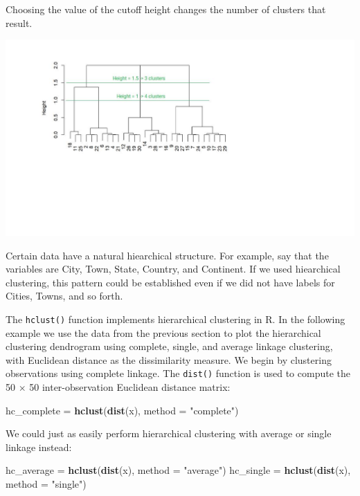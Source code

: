 \documentclass[openany]{book}
\newenvironment{Shaded}{\begin{snugshade}}{\end{snugshade}}
\newcommand{\DataTypeTok}[1]{\textcolor[rgb]{0.13,0.29,0.53}{#1}}
\newcommand{\KeywordTok}[1]{\textcolor[rgb]{0.13,0.29,0.53}{\textbf{#1}}}
\newcommand{\NormalTok}[1]{#1}
\newcommand{\StringTok}[1]{\textcolor[rgb]{0.31,0.60,0.02}{#1}}
\begin{document}
Choosing the value of the cutoff height changes the number of clusters that result.

\begin{center}\includegraphics[width=10\linewidth]{images/HClustering} \end{center}

Certain data have a natural hiearchical structure. For example, say that the variables are City, Town, State, Country, and Continent. If we used hiearchical clustering, this pattern could be established even if we did not have labels for Cities, Towns, and so forth.

The \texttt{hclust()} function implements hierarchical clustering in R. In the following example we use the data from the previous section to plot the hierarchical
clustering dendrogram using complete, single, and average linkage clustering,
with Euclidean distance as the dissimilarity measure. We begin by
clustering observations using complete linkage. The \texttt{dist()} function is used
to compute the 50 \(\times\) 50 inter-observation Euclidean distance matrix:

\begin{Shaded}
\begin{Highlighting}[]
\NormalTok{hc_complete =}\StringTok{ }\KeywordTok{hclust}\NormalTok{(}\KeywordTok{dist}\NormalTok{(x), }\DataTypeTok{method =} \StringTok{"complete"}\NormalTok{)}
\end{Highlighting}
\end{Shaded}

We could just as easily perform hierarchical clustering with average or
single linkage instead:

\begin{Shaded}
\begin{Highlighting}[]
\NormalTok{hc_average =}\StringTok{ }\KeywordTok{hclust}\NormalTok{(}\KeywordTok{dist}\NormalTok{(x), }\DataTypeTok{method =} \StringTok{"average"}\NormalTok{)}
\NormalTok{hc_single =}\StringTok{ }\KeywordTok{hclust}\NormalTok{(}\KeywordTok{dist}\NormalTok{(x), }\DataTypeTok{method =} \StringTok{"single"}\NormalTok{)}
\end{Highlighting}
\end{Shaded}
\end{document}
